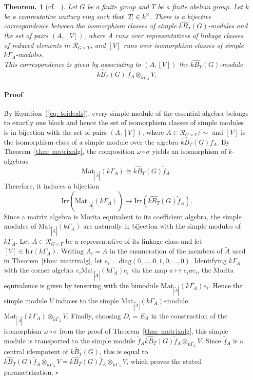 \documentclass[12pt]{article}
\theoremstyle{change}
\newtheorem{theorem}{Theorem.}[section]
\newenvironment{proof}{\paragraph{Proof}}{\hfill$\square$}
\newcommand{\calR}{\mathcal{R}}
\newcommand{\Irr}{\mathrm{Irr}}
\newcommand{\Mat}{\mathrm{Mat}}
\newcommand{\1}{{\bf 1}}
\begin{document}
\begin{theorem}[cf. \ {\cite[Section 9.1]{BC}}]\label{thm: simples}
Let $G$ be a finite group and $T$ be a finite abelian group. Let $k$ be a commutative unitary ring such that $|T|\in k^{\times}$. There is a bijective correspondence between the isomorphism classes of simple $\widehat{kB_T}(G)$-modules and the set of pairs $(A,[V])$, where $A$ runs over representatives of linkage classes of reduced elements in $\calR_{G\times T}$, and $[V]$ runs over isomorphism classes of simple $k\Gamma_A$-modules. \\
This correspondence is given by associating to $(A,[V])$ the $\widehat{kB_T}(G)$-module
    \[
   \widehat{kB_T}(G)\,\widehat{f}_A \otimes_{k\Gamma_A} V.
    \]
\end{theorem}
\begin{proof}
By Equation~(\ref{eq: toideals}), every simple module of the essential algebra belongs to exactly one block
and hence the set of isomorphism classes of simple modules is in bijection with the set of pairs $(A,[V])$, where $A\in \calR_{G\times T}/\sim$ and $[V]$ is the isomorphism class of a simple module over the algebra $\widehat{kB_T}(G)\widetilde{f}_A$. By Theorem~\ref{thm: matrixalg}, the composition $\omega\circ\sigma$ yields an isomorphism of $k$-algebras
\[
\Mat_{|\widetilde{A}|}(k\Gamma_A)
\cong
\widehat{kB_T}(G)\widetilde{f}_A.
\]
Therefore, it induces a bijection
\[
\Irr(\Mat_{|\widetilde{A}|}(k\Gamma_A))
\longrightarrow
\Irr(\widehat{kB_T}(G)\widetilde{f}_A).
\]
Since a matrix algebra is Morita equivalent to its coefficient algebra, the simple modules of $\Mat_{|\widetilde{A}|}(k\Gamma_A)$ are naturally in bijection with the simple modules of $k\Gamma_A$. Let $A\in\calR_{G\times T}$ be a representative of its linkage class and let $[V]\in\Irr(k\Gamma_A)$. Writing $A_i=A$ in the enumeration of the members of $\widetilde{A}$ used in Theorem~\ref{thm: matrixalg}, let $e_i=\text{diag}(0,\ldots,0,1,0,\ldots,0)$. Identifying $k\Gamma_A$ with the corner algebra $e_i\Mat_{|\widetilde{A}|}(k\Gamma_A)e_i$ via the map $a\mapsto e_iae_i$, the Morita equivalence is given by tensoring with the bimodule $\Mat_{|\widetilde{A}|}(k\Gamma_A)e_i$. Hence the simple module $V$ induces to the simple $\Mat_{|\widetilde{A}|}(k\Gamma_A)$-module $\Mat_{|\widetilde{A}|}(k\Gamma_A)\otimes_{k\Gamma_A}V$. Finally, choosing $D_i=E_A$ in the construction of the isomorphism $\omega\circ\sigma$ from the proof of Theorem~\ref{thm: matrixalg}, this simple module is transported to the simple module $\widetilde{f}_A\widehat{kB_T}(G)\widetilde{f}_A \otimes_{k\Gamma_A}V$. Since $\widetilde{f}_A$ is a central idempotent of $\widehat{kB_T}(G)$, this is equal to $\widehat{kB_T}(G)\widetilde{f}_A
\otimes_{k\Gamma_A}V = \widehat{kB_T}(G)\widehat{f}_A
\otimes_{k\Gamma_A}V$, which proves the stated parametrization.
\end{proof}
\end{document}
